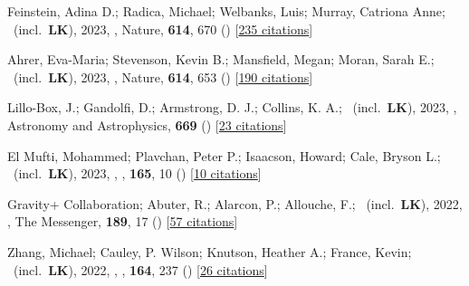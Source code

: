 \item[{\color{numcolor}\scriptsize81}] Feinstein, Adina D.; Radica, Michael; Welbanks, Luis; Murray, Catriona Anne; \etal\ (incl.\ \textbf{LK}), 2023, , Nature, \textbf{614}, 670 () [\href{https://ui.adsabs.harvard.edu/abs/2023Natur.614..670F}{235 citations}]

\item[{\color{numcolor}\scriptsize80}] Ahrer, Eva-Maria; Stevenson, Kevin B.; Mansfield, Megan; Moran, Sarah E.; \etal\ (incl.\ \textbf{LK}), 2023, , Nature, \textbf{614}, 653 () [\href{https://ui.adsabs.harvard.edu/abs/2023Natur.614..653A}{190 citations}]

\item[{\color{numcolor}\scriptsize79}] Lillo-Box, J.; Gandolfi, D.; Armstrong, D. J.; Collins, K. A.; \etal\ (incl.\ \textbf{LK}), 2023, , Astronomy and Astrophysics, \textbf{669} () [\href{https://ui.adsabs.harvard.edu/abs/2023A&A...669A.109L}{23 citations}]

\item[{\color{numcolor}\scriptsize78}] El Mufti, Mohammed; Plavchan, Peter P.; Isaacson, Howard; Cale, Bryson L.; \etal\ (incl.\ \textbf{LK}), 2023, , \aj, \textbf{165}, 10 () [\href{https://ui.adsabs.harvard.edu/abs/2023AJ....165...10E}{10 citations}]

\item[{\color{numcolor}\scriptsize77}] Gravity+ Collaboration; Abuter, R.; Alarcon, P.; Allouche, F.; \etal\ (incl.\ \textbf{LK}), 2022, , The Messenger, \textbf{189}, 17 () [\href{https://ui.adsabs.harvard.edu/abs/2022Msngr.189...17A}{57 citations}]

\item[{\color{numcolor}\scriptsize76}] Zhang, Michael; Cauley, P. Wilson; Knutson, Heather A.; France, Kevin; \etal\ (incl.\ \textbf{LK}), 2022, , \aj, \textbf{164}, 237 () [\href{https://ui.adsabs.harvard.edu/abs/2022AJ....164..237Z}{26 citations}]

